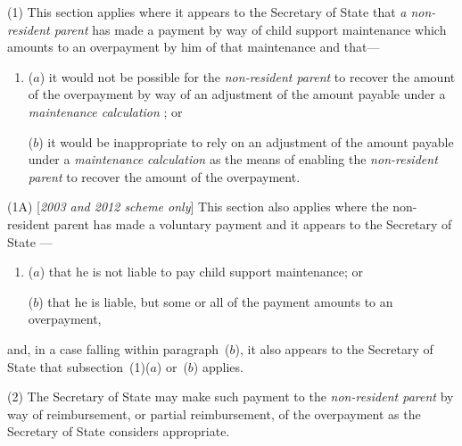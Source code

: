 \documentclass[12pt,a4paper]{article}
\begin{document}
(1) This section applies where it appears to the 
Secretary of State  %
that 
\emph{a non-resident parent}  %
has made a payment by way of child support maintenance which amounts to an overpayment by him of that maintenance and that—
\begin{enumerate}\item[]
($a$) it would not be possible for the 
\emph{non-resident parent}  %
to recover the amount of the overpayment by way of an adjustment of the amount payable under a 
\emph{maintenance calculation}%
; or

($b$) it would be inappropriate to rely on an adjustment of the amount payable under a 
\emph{maintenance calculation}  %
as the means of enabling the 
\emph{non-resident parent}  %
to recover the amount of the overpayment.
\end{enumerate}

(1A) [\emph{2003 and 2012 scheme only}] This section also applies where the non-resident parent has made a voluntary payment and it appears to the 
Secretary of State%
—
\begin{enumerate}\item[]
($a$) that he is not liable to pay child support maintenance; or

($b$) that he is liable, but some or all of the payment amounts to an overpayment,
\end{enumerate}
and, in a case falling within paragraph~($b$), it also appears to 
the Secretary of State  %
that subsection~(1)($a$)  or~($b$)  applies.

(2) The 
Secretary of State  %
may make such payment to the 
\emph{non-resident parent}  %
by way of reimbursement, or partial reimbursement, of the overpayment as the 
Secretary of State  %
considers appropriate.
\end{document}
